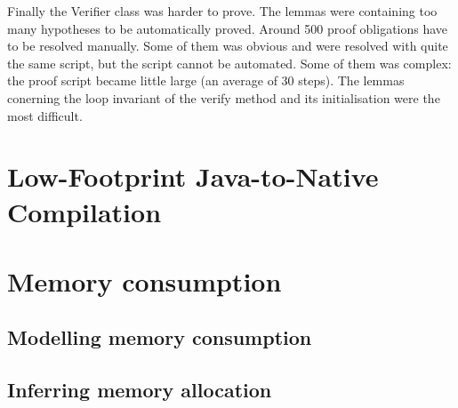 Finally the Verifier class was harder to prove.
The lemmas were containing too many hypotheses to be automatically proved.
Around 500 proof obligations have to be resolved manually.
Some of them was obvious and were resolved with quite the same script, but the script cannot be automated.
Some of them was complex: the proof script became little large (an average of 30 steps).
The lemmas conerning the loop invariant of the verify method and its initialisation were the most difficult.
\section{Low-Footprint Java-to-Native Compilation}

\section{Memory consumption}

%
\subsection{Modelling memory consumption}\label{sec:verif}

\subsection{Inferring memory allocation}\label{sec:infer}

%
